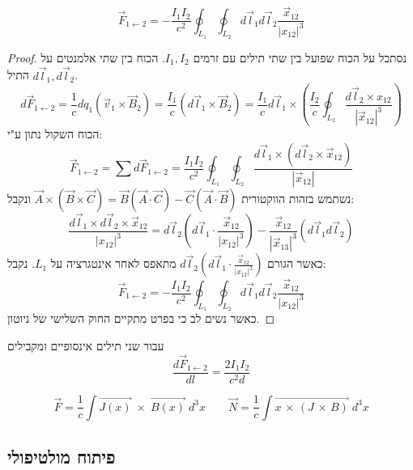 \documentclass{tstextbook}
\begin{document}
\begin{proposition}
$$\vec{F}_{1\leftarrow 2}= - \frac{I_{1}I_{2}}{c^2} \oint_{L_{1}}\oint_{L_{2}} d\vec{l}_{1}d\vec{l}_{2} \frac{\vec{x}_{12}}{\lvert x_{12} \rvert ^3}$$

\end{proposition}
\begin{proof}
נסתכל על הכוח שפועל בין שתי תילים עם זרמים  \(I_{1},I_{2}\). הכוח בין שתי אלמנטים על התיל \(d\vec{l}_{1},d\vec{l}_{2}\).
$$d\vec{F}_{1\leftarrow 2 } = \frac{1}{c}dq_{1}\left( \vec{v}_{1} \times \vec{B}_{2} \right)= \frac{I_{1}}{c}\left( d\vec{l}_{1}\times \vec{B}_{2} \right) = \frac{I_{1}}{c}d\vec{l}_{1}\times\left( \frac{I_{2}}{c}\oint_{L_{2}} \frac{d\vec{l}_{2} \times x_{12}}{\left\lvert  \vec{x}_{12}  \right\rvert ^3} \right)$$
הכוח השקול נתון ע"י:
$$\vec{F}_{1\leftarrow 2} = \sum d\vec{F}_{1\leftarrow 2}=\frac{I_{1}I_{2}}{c^2}\oint_{L_{1}}\oint_{L_{2}} \frac{d\vec{l}_{1} \times \left( d\vec{l}_{2}\times \vec{x}_{12} \right)}{\left\lvert  \vec{x}_{12}  \right\rvert }$$
נשתמש בזהות הווקטורית \(\vec{A}\times\left( \vec{B}\times \vec{C} \right)=\vec{B}\left( \vec{A}\cdot \vec{C} \right)-\vec{C}\left( \vec{A}\cdot \vec{B} \right)\) ונקבל:
$$\frac{d\vec{l}_{1} \times d\vec{l}_{2} \times \vec{x}_{12}}{\lvert x_{12} \rvert ^3}=d\vec{l}_{2}\left( d\vec{l}_{1} \cdot \frac{\vec{x}_{12}}{\lvert x_{12} \rvert ^3} \right)- \frac{\vec{x}_{12}}{\left\lvert  \vec{x}_{13}  \right\rvert ^3}\left( d\vec{l}_{1}d\vec{l}_{2} \right)$$
כאשר הגורם \(d\vec{l}_{2}\left( d\vec{l}_{1} \cdot \frac{\vec{x}_{12}}{\lvert x_{12} \rvert ^3} \right)\) מתאפס לאחר אינטגרציה על \(L_{1}\). נקבל:
$$\vec{F}_{1\leftarrow 2}= - \frac{I_{1}I_{2}}{c^2} \oint_{L_{1}}\oint_{L_{2}} d\vec{l}_{1}d\vec{l}_{2} \frac{\vec{x}_{12}}{\lvert x_{12} \rvert ^3}$$
כאשר נשים לב כי בפרט מתקיים החוק השלישי של ניוטון.

\end{proof}
\begin{example}
עבור שני תילים אינסופיים ומקבילים
$$\frac{d\vec{F}_{1\leftarrow {2}}}{dl}=\frac{2I_{1}I_{2}}{c^2d}$$

\end{example}
\begin{proposition}
$$\vec{F}={\frac{1}{c}}\int\vec{J(x)}\;\times\;\vec{B(x)}\;d^{3}x\qquad {{{\vec{N}}={\frac{1}{c}}\int\vec{x\,\times\,(J\,\times\,B)}\;d^{3}x}}$$

\end{proposition}
\subsection{פיתוח מולטיפולי}
\end{document}
